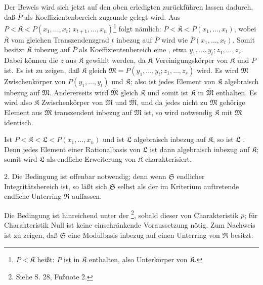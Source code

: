 Der Beweis wird sich jetzt auf den oben erledigten zurückführen lassen dadurch, daß $\overline P$ als Koeffizientenbereich zugrunde gelegt wird. Aus $P<\mathfrak K< P(x_1,\ldots,x_t;\,x_{t+1},\ldots,x_n)$\footnote{$P<\mathfrak K$ heißt: $P$ ist in $\mathfrak K$ enthalten, also Unterkörper von $\mathfrak K$.} folgt nämlich: $\overline P<\overline{\mathfrak K}<\overline P(x_1,\ldots,x_t)$, wobei $\overline{\mathfrak K}$ vom gleichen Transzendenzgrad $t$ inbezug auf $\overline P$ wird wie $\overline P(x_1,\ldots,x_t)$. Somit besitzt $\overline{\mathfrak K}$ inbezug auf $\overline P$ als Koeffizientenbereich eine , etwa $y_1,\ldots,y_t; z_1,\ldots,z_s$. Dabei können die $z$ aus $\mathfrak K$ gewählt werden, da $\overline{\mathfrak K}$ Vereinigungskörper von $\mathfrak K$ und $\overline P$ ist. Es ist zu zeigen, daß $\mathfrak K$ gleich $\mathfrak M=P(y_1,\ldots,y_t;z_1,\ldots,z_s)$ wird. Es wird $\mathfrak M$ Zwischenkörper von $P(y_1,\ldots,y_t)$ und $\mathfrak K$; also ist jedes Element von $\mathfrak K$ algebraisch inbezug auf $\mathfrak M$. Andererseits wird $\overline{\mathfrak M}$ gleich $\overline{\mathfrak K}$ und somit ist $\mathfrak K$ in $\overline{\mathfrak M}$ enthalten. Es wird also $\mathfrak K$ Zwischenkörper von $\mathfrak M$ und $\overline{\mathfrak M}$, und da jedes nicht zu $\mathfrak M$ gehörige Element aus $\overline{\mathfrak M}$ transzendent inbezug auf $\mathfrak M$ ist, so wird notwendig $\mathfrak K$ mit $\mathfrak M$ identisch.

 Ist $P<\mathfrak K<\mathfrak L<P(x_1,\ldots,x_n)$ und ist $\mathfrak L$ algebraisch inbezug auf $\mathfrak K$, so ist $\mathfrak L$ . Denn jedes Element einer Rationalbasis von $\mathfrak L$ ist dann algebraisch inbezug auf $\mathfrak K$; somit wird $\mathfrak L$ als endliche Erweiterung von $\mathfrak K$ charakterisiert.

2.  Die Bedingung ist offenbar notwendig; denn wenn $\mathfrak S$ endlicher Integritätsbereich ist, so läßt sich $\mathfrak S$ selbst als der im Kriterium auftretende endliche Unterring $\mathfrak R$ auffassen.

Die Bedingung ist hinreichend unter der \footnote{Siehe S. 28, Fußnote 2.}, sobald dieser von Charakteristik $p$; für Charakteristik Null ist keine einschränkende Voraussetzung nötig. Zum Nachweis ist zu zeigen, daß $\mathfrak S$ eine  Modulbasis inbezug auf einen Unterring von $\mathfrak R$ besitzt.

